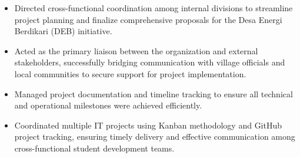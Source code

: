 \vspace{-0.3em}
\begin{itemize}
  \item Directed cross-functional coordination among internal divisions to streamline project planning and finalize comprehensive proposals for the Desa Energi Berdikari (DEB) initiative.
  \item Acted as the primary liaison between the organization and external stakeholders, successfully bridging communication with village officials and local communities to secure support for project implementation.
  \item Managed project documentation and timeline tracking to ensure all technical and operational milestones were achieved efficiently.
\end{itemize}

\vspace{-0.3em}
\begin{itemize}
  \item Coordinated multiple IT projects using Kanban methodology and GitHub project tracking, ensuring timely delivery and effective communication among cross-functional student development teams.
\end{itemize}




